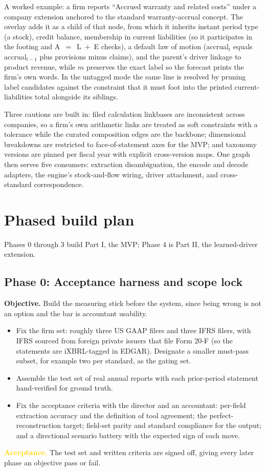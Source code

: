 \documentclass[11pt]{article}
\newcommand{\lead}[2]{\par\addvspace{5pt}\textbf{\textcolor{#1}{#2}}}
\begin{document}
A worked example: a firm reports ``Accrued warranty and related costs'' under a company extension anchored to the standard warranty-accrual concept. The overlay adds it as a child of that node, from which it inherits instant period type (a stock), credit balance, membership in current liabilities (so it participates in the footing and A~$=$~L~$+$~E checks), a default law of motion (accrual$_t$ equals accrual$_{t-1}$ plus provisions minus claims), and the parent's driver linkage to product revenue, while $m$ preserves the exact label so the forecast prints the firm's own words. In the untagged mode the same line is resolved by pruning label candidates against the constraint that it must foot into the printed current-liabilities total alongside its siblings.

Three cautions are built in: filed calculation linkbases are inconsistent across companies, so a firm's own arithmetic links are treated as soft constraints with a tolerance while the curated composition edges are the backbone; dimensional breakdowns are restricted to face-of-statement axes for the MVP; and taxonomy versions are pinned per fiscal year with explicit cross-version maps. One graph then serves five consumers: extraction disambiguation, the encode and decode adapters, the engine's stock-and-flow wiring, driver attachment, and cross-standard correspondence.

\section{Phased build plan}
Phases 0 through 3 build Part I, the MVP; Phase 4 is Part II, the learned-driver extension.

\subsection{Phase 0: Acceptance harness and scope lock}
\lead{navytwo}{Objective.} Build the measuring stick before the system, since being wrong is not an option and the bar is accountant usability.
\begin{itemize}
  \item Fix the firm set: roughly three US GAAP filers and three IFRS filers, with IFRS sourced from foreign private issuers that file Form 20-F (so the statements are iXBRL-tagged in EDGAR). Designate a smaller must-pass subset, for example two per standard, as the gating set.
  \item Assemble the test set of real annual reports with each prior-period statement hand-verified for ground truth.
  \item Fix the acceptance criteria with the director and an accountant: per-field extraction accuracy and the definition of tool agreement; the perfect-reconstruction target; field-set parity and standard compliance for the output; and a directional scenario battery with the expected sign of each move.
\end{itemize}
\lead{gold}{Acceptance.} The test set and written criteria are signed off, giving every later phase an objective pass or fail.
\end{document}

